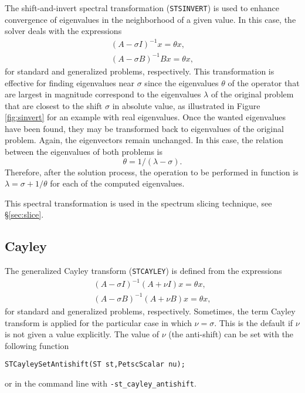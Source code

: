 	The shift-and-invert spectral transformation (\texttt{STSINVERT}) is used to enhance convergence of eigenvalues in the neighborhood of a given value. In this case, the solver deals with the expressions
\begin{eqnarray}
(A-\sigma I)^{-1}x=\theta x,\\
(A-\sigma B)^{-1}B x=\theta x,
\end{eqnarray}
for standard and generalized problems, respectively.
This transformation is effective for finding eigenvalues near $\sigma$ since the eigenvalues $\theta$ of the operator that are largest in magnitude correspond to the eigenvalues $\lambda$ of the original problem that are closest to the shift $\sigma$ in absolute value, as illustrated in Figure \ref{fig:sinvert} for an example with real eigenvalues. Once the wanted eigenvalues have been found, they may be transformed back to eigenvalues of the original problem. Again, the eigenvectors remain unchanged.
In this case, the relation between the eigenvalues of both problems is
\begin{equation}\theta=1/(\lambda-\sigma).\end{equation}
Therefore, after the solution process, the operation to be performed in function  is $\lambda=\sigma+1/\theta$ for each of the computed eigenvalues.

This spectral transformation is used in the spectrum slicing technique, see \S\ref{sec:slice}.

\subsection{Cayley}
\label{sec:cayley}

	The generalized Cayley transform (\texttt{STCAYLEY}) is defined from the expressions
\begin{eqnarray}
(A-\sigma I)^{-1}(A+\nu I)x=\theta x,\\
(A-\sigma B)^{-1}(A+\nu B)x=\theta x,
\end{eqnarray}
for standard and generalized problems, respectively. Sometimes, the term Cayley transform is applied for the particular case in which $\nu=\sigma$. This is the default if $\nu$ is not given a value explicitly. The value of $\nu$ (the anti-shift) can be set with the following function
	\begin{Verbatim}[fontsize=\small]
	STCayleySetAntishift(ST st,PetscScalar nu);
	\end{Verbatim}
or in the command line with \Verb!-st_cayley_antishift!.

